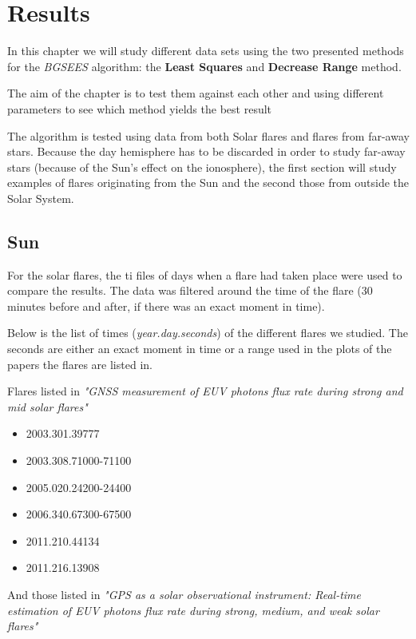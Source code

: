 \chapter{Results}

In this chapter we will study different data sets using the two presented methods for the \textit{BGSEES} algorithm: the \textbf{Least Squares} and \textbf{Decrease Range} method. 

The aim of the chapter is to test them against each other and using different parameters to see which method yields the best result

The algorithm is tested using data from both Solar flares and flares from far-away stars. Because the day hemisphere has to be discarded in order to study far-away stars (because of the Sun's effect on the ionosphere), the first section will study examples of flares originating from the Sun and the second those from outside the Solar System.

\section{Sun}

For the solar flares, the ti files of days when a flare had taken place were used to compare the results. The data was filtered around the time of the flare (30 minutes before and after, if there was an exact moment in time).
 
Below is the list of times (\textit{year.day.seconds}) of the different flares we studied. The seconds are either an exact moment in time or a range used in the plots of the papers the flares are listed in.

Flares listed in \textit{"GNSS measurement of EUV photons flux rate during strong and mid solar flares"}\cite{hernandez2012gnss}

\begin{itemize}
	\item 2003.301.39777
	\item 2003.308.71000-71100
	\item 2005.020.24200-24400
	\item 2006.340.67300-67500
	\item 2011.210.44134
	\item 2011.216.13908
\end{itemize}

And those listed in \textit{"GPS as a solar observational instrument: Real-time estimation of EUV photons flux rate during strong, medium, and weak solar flares"}\cite{singh2015gps}

